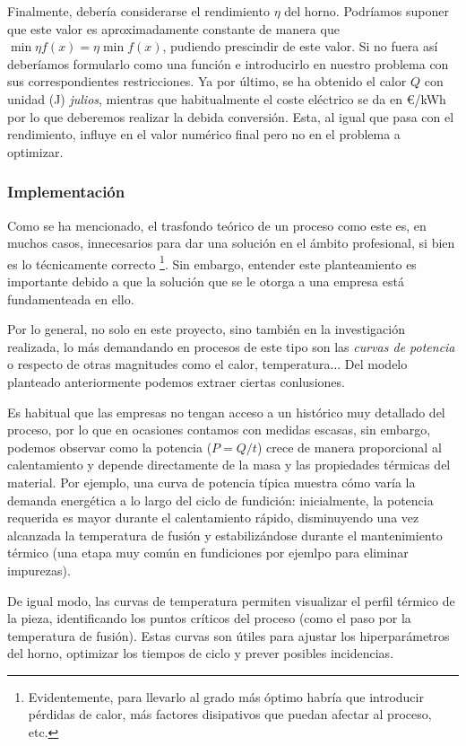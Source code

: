 Finalmente, debería considerarse el rendimiento $\eta$ del horno. Podríamos suponer que este valor es aproximadamente constante de manera que $\min{\eta f(x)} = \eta \min{f(x)}$, pudiendo prescindir de este valor. Si no fuera así deberíamos formularlo como una función e introducirlo en nuestro problema con sus correspondientes restricciones. Ya por último, se ha obtenido el calor $Q$ con unidad (J) \textit{julios}, mientras que habitualmente el coste eléctrico se da en \euro/kWh por lo que deberemos realizar la debida conversión. Esta, al igual que pasa con el rendimiento, influye en el valor numérico final pero no en el problema a optimizar.
%
%
\subsubsection{Implementación}
%
%
Como se ha mencionado, el trasfondo teórico de un proceso como este es, en muchos casos, innecesarios para dar una solución en el ámbito profesional, si bien es lo técnicamente correcto \footnote{Evidentemente, para llevarlo al grado más óptimo habría que introducir pérdidas de calor, más factores disipativos que puedan afectar al proceso, etc.}. Sin embargo, entender este planteamiento es importante debido a que la solución que se le otorga a una empresa está fundamenteada en ello.

Por lo general, no solo en este proyecto, sino también en la investigación realizada, lo más demandando en procesos de este tipo son las \textit{curvas de potencia} o respecto de otras magnitudes como el calor, temperatura... Del modelo planteado anteriormente podemos extraer ciertas conlusiones.

Es habitual que las empresas no tengan acceso a un histórico muy detallado del proceso, por lo que en ocasiones contamos con medidas escasas, sin embargo, podemos observar como la potencia ($P = Q/t$) crece de manera proporcional al calentamiento y depende directamente de la masa y las propiedades térmicas del material. Por ejemplo, una curva de potencia típica muestra cómo varía la demanda energética a lo largo del ciclo de fundición: inicialmente, la potencia requerida es mayor durante el calentamiento rápido, disminuyendo una vez alcanzada la temperatura de fusión y estabilizándose durante el mantenimiento térmico (una etapa muy común en fundiciones por ejemlpo para eliminar impurezas).

De igual modo, las curvas de temperatura permiten visualizar el perfil térmico de la pieza, identificando los puntos críticos del proceso (como el paso por la temperatura de fusión). Estas curvas son útiles para ajustar los hiperparámetros del horno, optimizar los tiempos de ciclo y prever posibles incidencias.
%
%
